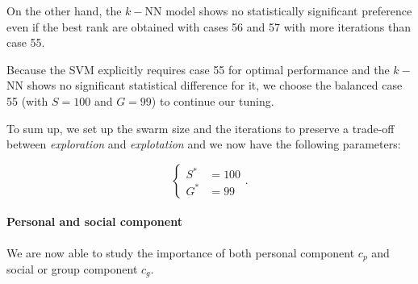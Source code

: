 \documentclass[12pt, openany]{article}
\begin{document}
On the other hand, the $k-$NN model shows no statistically significant preference even if the best rank are obtained with cases 56 and 57 with more iterations than case 55.

Because the SVM explicitly requires case 55 for optimal performance and the $k-$NN shows no significant statistical difference for it, we choose the balanced case 55 (with $S=100$ and $G=99$) to continue our tuning.

\begin{table}[H]
    \centering
    \renewcommand{\arraystretch}{1.3}
    \caption{\textbf{Summary of statistical significance tests for the Swarm Size / Iterations ratios (Cases 55--57).} The Critical Difference (CD) sets the threshold for Nemenyi pairwise significance. No difference is significant globally or for the $k$-NN model ($p \ge 0.05$); for the SVM model the omnibus test is significant and Nemenyi separates Cases 55 and 56.}
    \label{tab:statistical_tests_S_G}
\end{table}

To sum up, we set up the swarm size and the iterations to preserve a trade-off between \emph{exploration} and \emph{explotation} and we now have the following parameters:

$$
\boxed{
\begin{cases}
    S^* &= 100\\
    G^* &= 99
\end{cases}
}.
$$

\paragraph{Personal and social component} We are now able to study the importance of both personal component $c_p$ and social or group component $c_g$.
\end{document}
